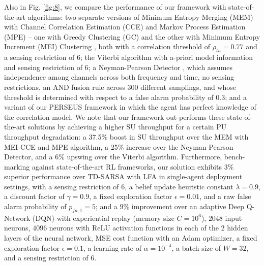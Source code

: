 \documentclass[10pt,twocolumn]{IEEEtran}
\begin{document}
Also in Fig. \ref{fig:8}, we compare the performance of our framework with state-of-the-art algorithms: two separate versions of Minimum Entropy Merging (MEM) with Channel Correlation Estimation (CCE) and Markov Process Estimation (MPE) -- one with Greedy Clustering (GC) and the other with Minimum Entropy Increment (MEI) Clustering \cite{6956794}, both with a correlation threshold of $\rho_{th}{=}0.77$ and a sensing restriction of $6$; the Viterbi algorithm \cite{4554696} with a-priori model information and sensing restriction of $6$; a Neyman-Pearson Detector \cite{5167826}, which assumes independence among channels across both frequency and time, no sensing restrictions, an AND fusion rule across 300 different samplings, and whose threshold is determined with respect to a false alarm probability of $0.3$; and a variant of our PERSEUS framework in which the agent has perfect knowledge of the correlation model. We note that our framework out-performs these state-of-the-art solutions by achieving a higher SU throughput for a certain PU throughput degradation: a 37.5\% boost in SU throughput over the MEM with MEI-CCE and MPE algorithm, a 25\% increase over the Neyman-Pearson Detector, and a 6\% upswing over the Viterbi algorithm. Furthermore, bench-marking against state-of-the-art RL frameworks, our solution exhibits $3$\% superior performance over TD-SARSA with LFA \cite{6507570} in single-agent deployment settings, with a sensing restriction of $6$, a belief update heuristic constant $\lambda{=}0.9$, a discount factor of $\gamma{=}0.9$, a fixed exploration factor $\epsilon{=}0.01$, and a raw false alarm probability of $p_{fa,1}{=}5$; and a $9$\% improvement over an adaptive Deep Q-Network (DQN) \cite{DQN} with experiential replay (memory size $C{=}10^{6}$), $2048$ input neurons, $4096$ neurons with ReLU activation functions in each of the $2$ hidden layers of the neural network, MSE cost function with an Adam optimizer, a fixed exploration factor $\epsilon{=}0.1$, a learning rate of $\alpha{=}10^{-4}$, a batch size of $W{=}32$, and a sensing restriction of $6$.
\vspace{-3mm}
\end{document}
